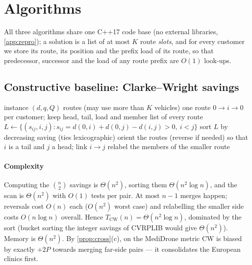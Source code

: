 \section{Algorithms}\label{sec:methods}
All three algorithms share one C++17 code base (no external libraries, \cref{app:repro});
a solution is a list of at most $K$ route \emph{slots}, and for every customer we store its
route, its position and the prefix load of its route, so that predecessor, successor and the
load of any route prefix are $O(1)$ look-ups.

\subsection{Constructive baseline: Clarke--Wright savings}
\begin{algorithm}[h]
\caption{Parallel Clarke--Wright savings \citep{clarke1964scheduling}}\label{alg:cw}
\small
\begin{algorithmic}[1]
\Require instance $(d,q,Q)$ \Ensure routes (may use more than $K$ vehicles)
\State one route $0\to i\to0$ per customer; keep head, tail, load and member list of every route
\State $L\gets\{(s_{ij},i,j): s_{ij}=d(0,i)+d(0,j)-d(i,j)>0,\ i<j\}$ 
\State sort $L$ by decreasing saving (ties lexicographic) 
     \State orient the routes (reverse if needed) so that $i$ is a tail and $j$ a head; link $i\to j$
     \State relabel the members of the smaller route 
  \EndIf
\EndFor
\end{algorithmic}
\end{algorithm}
\paragraph{Complexity} Computing the $\binom n2$ savings is $\Theta(n^2)$, sorting them
$\Theta(n^2\log n)$, and the scan is $\Theta(n^2)$ with $O(1)$ tests per pair. At most $n-1$ merges
happen; reversals cost $O(n)$ each ($O(n^2)$ worst case) and relabelling the smaller side costs
$O(n\log n)$ overall. Hence $T_{\mathrm{CW}}(n)=\Theta(n^2\log n)$, dominated by the sort (bucket
sorting the integer savings of CVRPLIB would give $\Theta(n^2)$). Memory is $\Theta(n^2)$.
By \cref{prop:cross}(c), on the MediDrone metric CW is biased by exactly $+2P$ towards merging
far-side pairs --- it consolidates the European clinics first.

